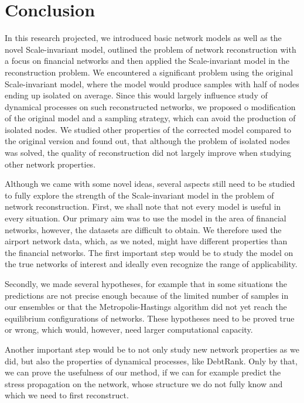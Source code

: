 \chapter*{Conclusion} %
In this research projected, we introduced basic network models as well as the novel Scale-invariant model, outlined the problem of network reconstruction with a focus on financial networks and then applied the Scale-invariant model in the reconstruction problem. We encountered a significant problem using the original Scale-invariant model, where the model would produce samples with half of nodes ending up isolated on average. Since this would largely influence study of dynamical processes on such reconstructed networks, we proposed o modification of the original model and a sampling strategy, which can avoid the production of isolated nodes. We studied other properties of the corrected model compared to the original version and found out, that although the problem of isolated nodes was solved, the quality of reconstruction did not largely improve when studying other network properties.

Although we came with some novel ideas, several aspects still need to be studied to fully explore the strength of the Scale-invariant model in the problem of network reconstruction. First, we shall note that not every model is useful in every situation. Our primary aim was to use the model in the area of financial networks, however, the datasets are difficult to obtain. We therefore used the airport network data, which, as we noted, might have different properties than the financial networks. The first important step would be to study the model on the true networks of interest and ideally even recognize the range of applicability.

Secondly, we made several hypotheses, for example that in some situations the predictions are not precise enough because of the limited number of samples in our ensembles or that the Metropolis-Hastings algorithm did not yet reach the equilibrium configurations of networks. These hypotheses need to be proved true or wrong, which would, however, need larger computational capacity. 

Another important step would be to not only study new network properties as we did, but also the properties of dynamical processes, like DebtRank. Only by that, we can prove the usefulness of our method, if we can for example predict the stress propagation on the network, whose structure we do not fully know and which we need to first reconstruct. 

